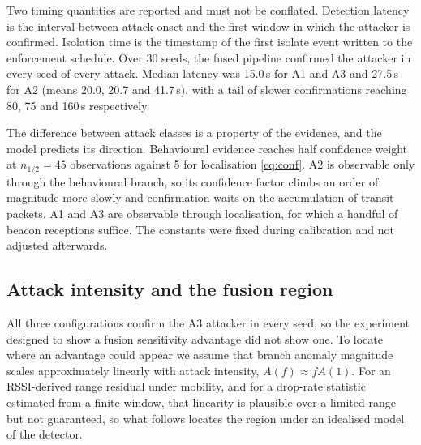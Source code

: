 Two timing quantities are reported and must not be conflated. Detection
latency is the interval between attack onset and the first window in which the
attacker is confirmed. Isolation time is the timestamp of the first isolate
event written to the enforcement schedule. Over 30 seeds, the fused pipeline
confirmed the attacker in every seed of every attack. Median latency was
15.0\,s for A1 and A3 and 27.5\,s for A2 (means 20.0, 20.7 and 41.7\,s), with
a tail of slower confirmations reaching 80, 75 and 160\,s respectively.

The difference between attack classes is a property of the evidence, and the
model predicts its direction. Behavioural evidence reaches half confidence
weight at $n_{1/2} = 45$ observations against 5 for localisation
\eqref{eq:conf}. A2 is observable only through the behavioural branch, so its
confidence factor climbs an order of magnitude more slowly and confirmation
waits on the accumulation of transit packets. A1 and A3 are observable through
localisation, for which a handful of beacon receptions suffice. The constants were
fixed during calibration and not adjusted afterwards.

\subsection{Attack intensity and the fusion region}
\label{sec:region}

All three configurations confirm the A3 attacker in every seed, so the
experiment designed to show a fusion sensitivity advantage did not show one.
To locate where an advantage could appear we assume that branch anomaly
magnitude scales approximately linearly with attack intensity,
$A(f) \approx f A(1)$. For an RSSI-derived range residual under mobility, and
for a drop-rate statistic estimated from a finite window, that linearity is
plausible over a limited range but not guaranteed, so what follows locates the
region under an idealised model of the detector.

